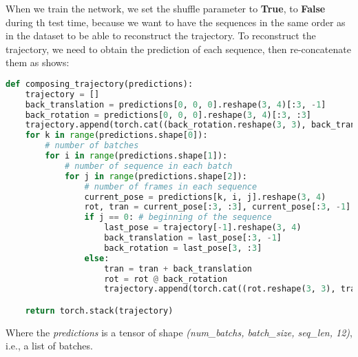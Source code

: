When we train the network, we set the shuffle parameter to \textbf{True}, to \textbf{False} during th test time, because we want to have the sequences in the same order as in the dataset to be able to reconstruct the trajectory.
To reconstruct the trajectory, we need to obtain the prediction of each sequence, then re-concatenate them as  shows:
\begin{lstlisting}[language=python,label={lst:reconstruct-trajectory}, caption ={Reconstruct the trajectory from the predictions which is a list of batches of sequences.}]
def composing_trajectory(predictions):
    trajectory = []
    back_translation = predictions[0, 0, 0].reshape(3, 4)[:3, -1]
    back_rotation = predictions[0, 0, 0].reshape(3, 4)[:3, :3]
    trajectory.append(torch.cat((back_rotation.reshape(3, 3), back_translation.reshape(3, 1)), dim=1).flatten())
    for k in range(predictions.shape[0]):
        # number of batches
        for i in range(predictions.shape[1]):
            # number of sequence in each batch
            for j in range(predictions.shape[2]):
                # number of frames in each sequence
                current_pose = predictions[k, i, j].reshape(3, 4)
                rot, tran = current_pose[:3, :3], current_pose[:3, -1]
                if j == 0: # beginning of the sequence
                    last_pose = trajectory[-1].reshape(3, 4)
                    back_translation = last_pose[:3, -1]
                    back_rotation = last_pose[3, :3]
                else:
                    tran = tran + back_translation
                    rot = rot @ back_rotation
                    trajectory.append(torch.cat((rot.reshape(3, 3), tran.reshape(3, 1)), dim=1).flatten())

    return torch.stack(trajectory)
\end{lstlisting}
Where the \textit{predictions} is a tensor of shape \textit{(num\_batchs, batch\_size, seq\_len, 12)}, i.e., a list of batches.
